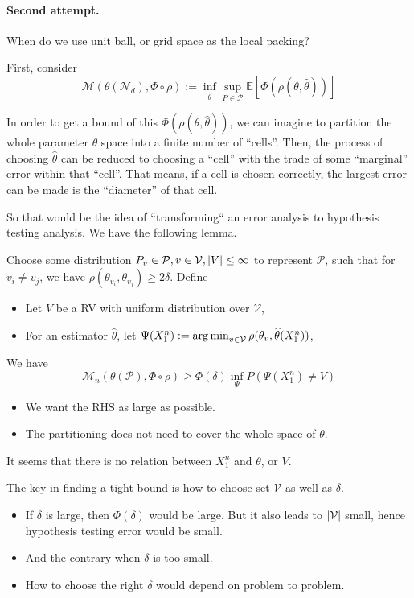\documentclass[11pt,a4paper]{article}
\begin{document}
\paragraph{Second attempt.} 

{\blue When do we use unit ball, or grid space as the local packing?}

First, consider 
\[
\mathcal{M}(\theta(\mathcal{N}_d), \Phi \circ \rho ) := \inf_{\widehat{\theta}} \sup_{P \in \mathcal{P}} \mathbb{E} [\Phi (\rho(\theta, \widehat{\theta}))]
\] 

In order to get a bound of this $\Phi (\rho (\theta, \widehat{\theta}))$, we can imagine to partition the whole  parameter $\theta$ space into a finite number of ``cells''. 
Then, the process of choosing $\widehat{\theta}$ can be reduced to choosing a ``cell'' with the trade of some ``marginal'' error within that ``cell''. That means, if a cell is chosen correctly, the largest error can be made is the ``diameter'' of that cell.

So that would be the idea of ``transforming`` an error analysis to hypothesis testing analysis. We have the following lemma.
\begin{lemma}
    Choose some distribution $P_v \in \mathcal{P}, v \in \mathcal{V}, \left\lvert V\right\rvert \leq \infty$ to represent $\mathcal{P}$, such that for $v_i \neq v_j$, we have $\rho(\theta_{v_i}, \theta_{v_j}) \geq 2\delta$. 
    Define
    \begin{itemize}[noitemsep]
        \item Let $V$ be a RV with uniform distribution over  $\mathcal{V}$,
        \item For an estimator $\widehat{\theta}$, let $\Psi(X_1^{n}) := \operatorname*{arg\,min}_{v \in \mathcal{V}} \rho(\theta_v, \widehat{\theta}(X_1^{n}))$, 
    \end{itemize}
    We have
    \[
    \mathcal{M}_{n}(\theta(\mathcal{P}), \Phi \circ \rho) \geq \Phi(\delta) \inf_{\Psi} P(\Psi(X_1^{n}) \neq V)
    \] 
\end{lemma}
\begin{itemize}[noitemsep]
    \item We want the RHS as large as possible.
    \item The partitioning does not need to cover the whole space of $\theta$.
\end{itemize}

{\blue It seems that there is no relation between $X_1^{n}$ and $\theta$, or $V$.}

\begin{remark}
    The key in finding a tight bound is how to choose set $\mathcal{V}$ as well as $\delta$. 
    \begin{itemize}[noitemsep]
        \item If $\delta$ is large, then $\Phi(\delta)$ would be large. But it also leads to $\left\lvert\mathcal{V}\right\rvert$ small, hence hypothesis testing error would be small.
        \item And the contrary when $\delta$ is too small.
        \item How to choose the right $\delta$ would depend on problem to problem.
    \end{itemize}
\end{remark}
\end{document}
